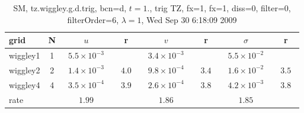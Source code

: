 \begin{table}[hbt]\tableFont %
\begin{center}
\begin{tabular}{|l|c|c|c|c|c|c|c|} \hline 
grid  & N &  $u$  & r &  $v$  & r &  $\sigma$   & r \\ \hline 
            wiggley1 &     1 & ~$5.5\times10^{ -3}$~ &           & ~$3.4\times10^{ -3}$~ &           & ~$5.5\times10^{ -2}$~ &            \\ \hline
            wiggley2 &     2 & ~$1.4\times10^{ -3}$~ & ~$  4.0$~ & ~$9.8\times10^{ -4}$~ & ~$  3.4$~ & ~$1.6\times10^{ -2}$~ & ~$  3.5$~  \\ \hline
            wiggley4 &     4 & ~$3.5\times10^{ -4}$~ & ~$  3.9$~ & ~$2.6\times10^{ -4}$~ & ~$  3.8$~ & ~$4.2\times10^{ -3}$~ & ~$  3.8$~  \\ \hline
    rate             &       &       $1.99$         &       &       $1.86$         &       &       $1.85$         &        \\ \hline
\end{tabular}
\caption{SM, tz.wiggley.g.d.trig, bcn=d, $t=1.$, trig TZ, fx=1, fx=1, diss=0, filter=0, filterOrder=6, $\lambda=1$, Wed Sep 30  6:18:09 2009}\label{table:tz.wiggley.g.d.trig}
\end{center}
\end{table}
